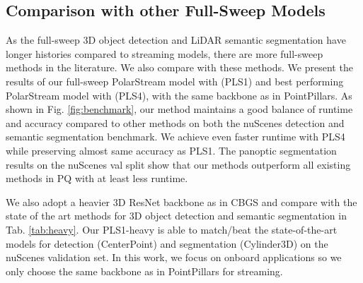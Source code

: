 \documentclass{article}
\begin{document}
\subsection{Comparison with other Full-Sweep Models}
As the full-sweep 3D object detection and LiDAR semantic segmentation have longer histories compared to streaming models, there are more full-sweep methods in the literature. We also compare with these methods. We present the results of our full-sweep PolarStream model with  (PLS1) and best performing PolarStream model with  (PLS4), with the same backbone as in PointPillars\cite{lang2019pointpillars}.  As shown in Fig. \ref{fig:benchmark}, our method maintains a good balance of runtime and accuracy compared to other methods on both the nuScenes detection and semantic segmentation benchmark. We achieve even faster runtime with PLS4 while preserving almost same accuracy as PLS1. The panoptic segmentation results on the nuScenes val split show that our methods outperform all existing methods in PQ with at least  less runtime. 

We also adopt a heavier 3D ResNet\cite{he2016deep} backbone as in CBGS\cite{zhu2019class} and compare with the state of the art methods for 3D object detection and semantic segmentation in Tab. \ref{tab:heavy}. Our PLS1-heavy is able to match/beat the state-of-the-art models for detection (CenterPoint\cite{yin2020center}) and segmentation (Cylinder3D\cite{zhou2020cylinder3d}) on the nuScenes validation set. In this work, we focus on onboard applications so we only choose the same backbone as in PointPillars\cite{lang2019pointpillars} for streaming.

\begin{table}
  \centering
  \renewcommand{\arraystretch}{1.2}
  \caption{Comparison with state-of-the-art methods on nuScenes Val split.}\label{tab:heavy}
\end{table}
\end{document}
